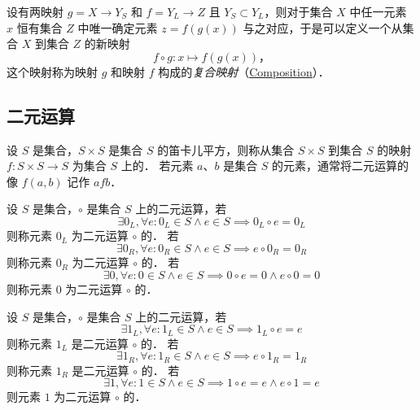设有两映射 $g=X\to{}Y_S$ 和 $f=Y_L\to{}Z$ 且 $Y_S\subset{}Y_L$，则对于集合 $X$ 中任一元素 $x$ 恒有集合 $Z$ 中唯一确定元素 $z=f(g(x))$ 与之对应，于是可以定义一个从集合 $X$ 到集合 $Z$ 的新映射
\[
f \circ g: x \mapsto f(g(x)) \text{，}
\]
这个映射称为映射 $g$ 和映射 $f$ 构成的\emph{复合映射}（\href{http://mathworld.wolfram.com/Composition.html}{Composition}）．

\subsection{二元运算}

\begin{Definition}\label{Definition:BinaryOperation}
    设 $S$ 是集合，$ S \times S $ 是集合 $S$ 的笛卡儿平方，则称从集合 $ S \times S $ 到集合 $S$ 的映射 $ f: S \times S \to S $ 为集合 $S$ 上的．
    若元素 $a$、$b$ 是集合 $S$ 的元素，通常将二元运算的像 $ f(a, b) $ 记作 $ a f b $．
\end{Definition}

\begin{Definition}[\textbf{零元}]\label{Definition:ZeroElement}
    设 $S$ 是集合，$\circ$ 是集合 $S$ 上的二元运算，若
    \[ \exists 0_L, \forall e : 0_L \in S \land e \in S \implies 0_L \circ e = 0_L \]
    则称元素 $0_L$ 为二元运算 $\circ$ 的．
    若
    \[ \exists 0_R, \forall e : 0_R \in S \land e \in S \implies e \circ 0_R = 0_R \]
    则称元素 $0_R$ 为二元运算 $\circ$ 的．
    若
    \[ \exists 0, \forall e : 0 \in S \land e \in S \implies 0 \circ e = 0 \land e \circ 0 = 0 \]
    则称元素 $0$ 为二元运算 $\circ$ 的．
\end{Definition}

\begin{Definition}[\textbf{幺元}]\label{Definition:IdentityElement}
    设 $S$ 是集合，$\circ$ 是集合 $S$ 上的二元运算，若
    \[ \exists 1_L, \forall e : 1_L \in S \land e \in S \implies 1_L \circ e = e \]
    则称元素 $1_L$ 是二元运算 $\circ$ 的．
    若
    \[ \exists 1_R, \forall e : 1_R \in S \land e \in S \implies e \circ 1_R = 1_R \]
    则称元素 $1_R$ 是二元运算 $\circ$ 的．
    若
    \[ \exists 1, \forall e : 1 \in S \land e \in S \implies 1 \circ e = e \land e \circ 1 = e \]
    则元素 $1$ 为二元运算 $\circ$ 的．
\end{Definition}

